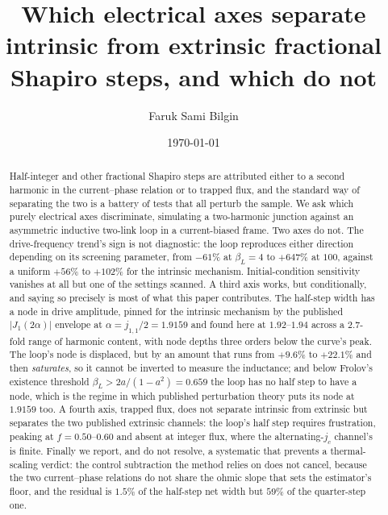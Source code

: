 \documentclass[aps,prb,twocolumn,superscriptaddress,floatfix,nofootinbib]{revtex4-2}
\begin{document}
\title{Which electrical axes separate intrinsic from extrinsic fractional
       Shapiro steps, and which do not}

\author{Faruk Sami Bilgin}

\date{\today}

\begin{abstract}
Half-integer and other fractional Shapiro steps are attributed either to a second
harmonic in the current--phase relation or to trapped flux, and the standard way
of separating the two is a battery of tests that all perturb the sample. We ask
which purely electrical axes discriminate, simulating a two-harmonic junction
against an asymmetric inductive two-link loop in a current-biased frame. Two
axes do not. The drive-frequency trend's sign is not diagnostic: the loop
reproduces either direction depending on its screening parameter, from $-61\%$
at $\beta_L=4$ to $+647\%$ at $100$, against a uniform $+56\%$ to $+102\%$ for
the intrinsic mechanism. Initial-condition sensitivity vanishes at all but one
of the settings scanned. A third axis works, but conditionally, and saying so
precisely is most of what this paper contributes. The half-step width has a node
in drive amplitude, pinned for the intrinsic mechanism by the published
$|J_1(2\alpha)|$ envelope at $\alpha=j_{1,1}/2=1.9159$ and found here at
$1.92$--$1.94$ across a $2.7$-fold range of harmonic content, with node depths
three orders below the curve's peak. The loop's node is displaced, but by an
amount that runs from $+9.6\%$ to $+22.1\%$ and then \emph{saturates}, so it
cannot be inverted to measure the inductance; and below Frolov's existence
threshold $\beta_L>2a/(1-a^2)=0.659$ the loop has no half step to have a node,
which is the regime in which published perturbation theory puts its node at
$1.9159$ too. A fourth axis, trapped flux, does not separate intrinsic from
extrinsic but separates the two published extrinsic channels: the loop's half
step requires frustration, peaking at $f=0.50$--$0.60$ and absent at integer
flux, where the alternating-$j_c$ channel's is finite. Finally we report, and do
not resolve, a systematic that prevents a thermal-scaling verdict: the control
subtraction the method relies on does not cancel, because the two
current--phase relations do not share the ohmic slope that sets the estimator's
floor, and the residual is $1.5\%$ of the half-step net width but $59\%$ of the
quarter-step one.
\end{abstract}
\end{document}
